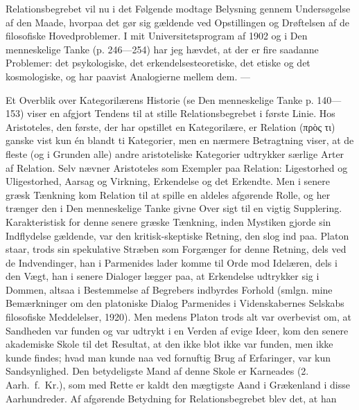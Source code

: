 \documentclass[12pt]{article}
\newcommand{\opage}[1]{\marginnote{\footnotesize\textit{[#1]}}}
\begin{document}
Relationsbegrebet vil nu i det Følgende modtage Belysning gennem Undersøgelse
af den Maade, hvorpaa det gør sig gældende ved Opstillingen og Drøftelsen af
de filosofiske Hovedproblemer. I mit Universitetsprogram af 1902 og i
\guillemotright Den menneskelige Tanke\guillemotleft{} (p. 246---254) har jeg
hævdet, at der er fire saadanne Problemer: det psykologiske, det
erkendelsesteoretiske, det etiske og det kosmologiske, og har paavist
Analogierne mellem dem. ---

\bigskip
Et Overblik over Kategorilærens Historie (se \guillemotright Den menneskelige
Tanke\guillemotleft{} p. 140---153) viser en afgjort Tendens til at stille
Relationsbegrebet i første Linie. Hos Aristoteles, den første, der har
opstillet en Kategorilære, er Relation (πρὸς τι) ganske vist kun én blandt ti
Kategorier, men en nærmere Betragtning viser, at de fleste (og i Grunden alle)
andre aristoteliske Kategorier udtrykker særlige Arter af Relation. Selv
nævner Aristoteles som Exempler paa Relation: Ligestorhed og Uligestorhed,
Aarsag og Virkning, Erkendelse og det Erkendte. Men i senere græsk Tænkning
kom Relation til at spille en aldeles afgørende Rolle, og her trænger den i
\guillemotright Den menneskelige Tanke\guillemotleft{} givne Over%
\opage{6}\setcounter{footnote}{0}%
sigt til en vigtig Supplering. Karakteristisk for denne senere græske
Tænkning, inden Mystiken gjorde sin Indflydelse gældende, var den
kritisk-skeptiske Retning, den slog ind paa. Platon staar, trods sin
spekulative Stræben som Forgænger for denne Retning, dels ved de
Indvendinger, han i \guillemotright Parmenides\guillemotleft{} lader komme til
Orde mod Idelæren, dels i den Vægt, han i senere Dialoger lægger paa, at
Erkendelse udtrykker sig i Dommen, altsaa i Bestemmelse af Begrebers
indbyrdes Forhold (smlgn. mine \guillemotright Bemærkninger om den platoniske
Dialog Parmenides\guillemotleft{} i Videnskabernes Selskabs filosofiske
Meddelelser, 1920). Men medens Platon trods alt var overbevist om, at
Sandheden var funden og var udtrykt i en Verden af evige Ideer, kom den senere
akademiske Skole til det Resultat, at den ikke blot ikke var funden, men ikke
kunde findes; hvad man kunde naa ved fornuftig Brug af Erfaringer, var kun
Sandsynlighed. Den betydeligste Mand af denne Skole er Karneades
(2. Aarh.\ f.\ Kr.), som med Rette er kaldt den mægtigste Aand i Grækenland i disse
Aarhundreder. Af afgørende Betydning for Relationsbegrebet blev det, at han
\end{document}

